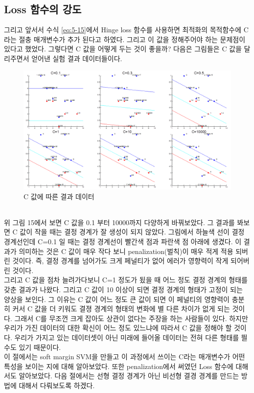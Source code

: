\documentclass[a4paper]{oblivoir}
\begin{document}
\subsection{Loss 함수의 강도}
\indent 그리고 앞서서 수식 \eqref{eq:5-15}에서 Hinge loss 함수를 사용하면 최적화의 목적함수에 C라는 절충 매개변수가 추가 된다고 하였다. 그리고 이 값을 정해주어야 하는 문제점이 있다고 했었다. 그렇다면 C 값을 어떻게 두는 것이 좋을까? 다음은 그림들은 C 값을 달리주면서 얻어낸 실험 결과 데이터들이다.\\
\begin{figure}[ht]\centering
\includegraphics[scale=0.5]{Strength_loss}\caption{C 값에 따른 결과 데이터}\label{Fig:5-15}
\end{figure}\\
\indent 위 그림 15에서 보면 C 값을 0.1 부터 10000까지 다양하게 바꿔보았다. 그 결과를 봐보면 C 값이 작을 때는 결정 경계가 잘 생성이 되지 않았다. 그림에서 하늘색 선이 결정 경계선인데 C=0.1 일 때는 결정 경계선이 빨간색 점과 파란색 점 아래에 생겼다. 이 결과가 의미하는 것은 C 값이 매우 작다 보니 penalization(벌칙)이 매우 적게 적용 되버린 것이다. 즉, 결정 경계를 넘어가도 크게 페널티가 없어 에러가 영향력이 작게 되어버린 것이다.\\
\indent  그리고 C 값을 점차 늘려가다보니 C=1 정도가 됬을 때 어느 정도 결정 경계의 형태를 갖춘 결과가 나왔다. 그리고 C 값이 10 이상이 되면 결정 경계의 형태가 고정이 되는 양상을 보인다. 그 이유는 C 값이 어느 정도 큰 값이 되면 이 페널티의 영향력이 충분히 커서 C 값을 더 키워도 결졍 경계의 형태의 변화에 별 다른 차이가 없게 되는 것이다. 그래서 C를 무조껀 크게 잡아도 상관이 없다는 주장을 하는 사람들이 있다. 하지만 우리가 가진 데이터의 대한 확신이 어느 정도 있느냐에 따라서 C 값을 정해야 할 것이다. 우리가 가지고 있는 데이터셋이 아닌 미래에 들어올 데이터는 전혀 다른 형태를 띌 수도 있기 때문이다.\\
\indent 이 절에서는 soft margin SVM을 만들고 이 과정에서 쓰이는 C라는 매개변수가 어떤 특성을 보이는 지에 대해 알아보았다. 또한 penalization에서 써였던 Loss 함수에 대해서도 알아보았다. 다음 절에서는 선형 결정 경계가 아닌 비선형 결경 경계를 만드는 방법에 대해서 다뤄보도록 하겠다.\\
\end{document}

